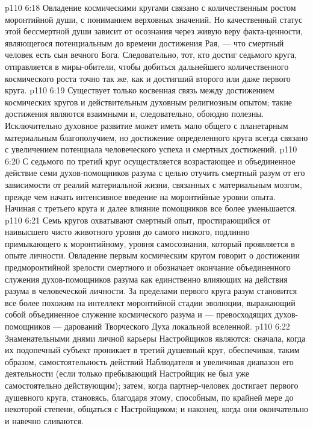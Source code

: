 \vs p110 6:18 Овладение космическими кругами связано с количественным ростом моронтийной души, с пониманием верховных значений. Но качественный статус этой бессмертной души  зависит от осознания через живую веру факта\hyp{}ценности, являющегося потенциальным до времени достижения Рая, --- что смертный человек есть сын вечного Бога. Следовательно, тот, кто достиг седьмого круга, отправляется в миры\hyp{}обители, чтобы добиться дальнейшего количественного космического роста точно так же, как и достигший второго или даже первого круга.
\vs p110 6:19 Существует только косвенная связь между достижением космических кругов и действительным духовным религиозным опытом; такие достижения являются взаимными и, следовательно, обоюдно полезны. Исключительно духовное развитие может иметь мало общего с планетарным материальным благополучием, но достижение определенного круга всегда связано с увеличением потенциала человеческого успеха и смертных достижений.
\vs p110 6:20 С седьмого по третий круг осуществляется возрастающее и объединенное действие семи духов\hyp{}помощников разума с целью отучить смертный разум от его зависимости от реалий материальной жизни, связанных с материальным мозгом, прежде чем начать интенсивное введение на моронтийные уровни опыта. Начиная с третьего круга и далее влияние помощников все более уменьшается.
\vs p110 6:21 \pc Семь кругов охватывают смертный опыт, простирающийся от наивысшего чисто животного уровня до самого низкого, подлинно примыкающего к моронтийному, уровня самосознания, который проявляется в опыте личности. Овладение первым космическим кругом говорит о достижении предморонтийной зрелости смертного и обозначает окончание объединенного служения духов\hyp{}помощников разума как единственно влияющих на действия разума в человеческой личности. За пределами первого круга разум становится все более похожим на интеллект моронтийной стадии эволюции, выражающий собой объединенное служение космического разума и --- превосходящих духов\hyp{}помощников --- дарований Творческого Духа локальной вселенной.
\vs p110 6:22 Знаменательными днями личной карьеры Настройщиков являются: сначала, когда их подопечный субъект проникает в третий душевный круг, обеспечивая, таким образом, самостоятельность действий Наблюдателя и увеличивая диапазон его деятельности (если только пребывающий Настройщик не был уже самостоятельно действующим); затем, когда партнер\hyp{}человек достигает первого душевного круга, становясь, благодаря этому, способным, по крайней мере до некоторой степени, общаться с Настройщиком; и наконец, когда они окончательно и навечно сливаются.
